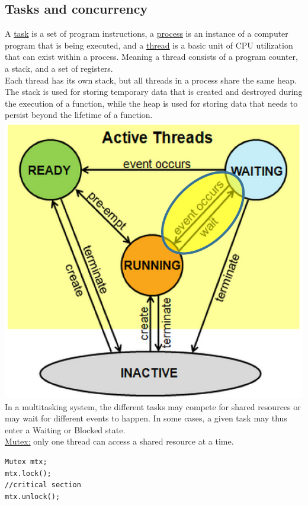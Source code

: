 \subsection*{Tasks and concurrency}
A \underline{task} is a set of program instructions, a \underline{process} is an instance of a computer program that
is being executed, and a \underline{thread} is a basic unit of CPU utilization that can exist within a
process. Meaning a thread consists of a program counter, a stack, and a set of registers.\\
Each thread has its own stack, but all threads in a process share the same heap. The stack is
used for storing temporary data that is created and destroyed during the execution of a
function, while the heap is used for storing data that needs to persist beyond the lifetime of
a function.
\includegraphics[width=\columnwidth]{images/thread_states.png}
In a multitasking system, the different tasks may compete for shared resources or may wait for
different events to happen. In some cases, a given task may thus enter a Waiting or Blocked state.\\
\underline{Mutex:} only one thread can access a shared resource at a time.
\begin{verbatim}
Mutex mtx;
mtx.lock();
//critical section
mtx.unlock();
\end{verbatim}
